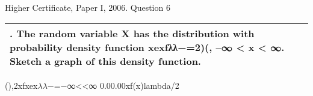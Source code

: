 \documentclass[a4paper,12pt]{article}
\begin{document}
Higher Certificate, Paper I, 2006. Question 6

\begin{table}[ht!]
     
\centering
     
\begin{tabular}{|p{15cm}|}
     
\hline        

\noindent
6. The random variable X has the distribution with probability density function
xexfλλ−=2)(, –∞ < x < ∞.
Sketch a graph of this density function.
\\ \hline
      
\end{tabular}
    
\end{table}



(),2xfxex$\lambda$$\lambda$−=−∞<<∞
0.00.00xf(x)lambda/2
\end{document}
